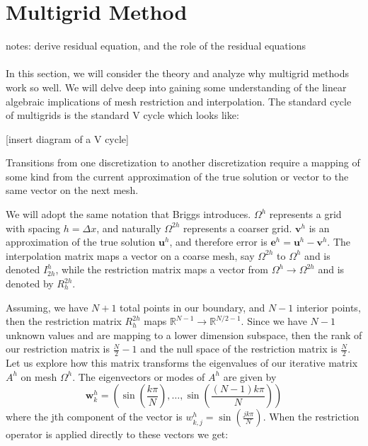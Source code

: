 \documentclass[pdftex,12pt,a4paper]{article}
\begin{document}
\section{Multigrid Method}

notes: 
derive residual equation, and the role of the residual equations



\paragraph{} In this section, we will consider the theory and analyze why multigrid methods work so well.  We will delve deep into gaining some understanding of the linear algebraic implications of mesh restriction and interpolation.  The standard cycle of multigrids is the standard V cycle which looks like: 

[insert diagram of a V cycle]

Transitions from one discretization to another discretization require a mapping of some kind from the current approximation of the true solution or vector to the same vector on the next mesh.  

We will adopt the same notation that Briggs introduces. $\Omega^{h}$ represents a grid with spacing $h = \Delta x $, and naturally $\Omega^{2h}$ represents a coarser grid.   $\mathbf{v}^h$ is an approximation of the true solution $\mathbf{u}^h$, and therefore error is $\mathbf{e}^h = \mathbf{u}^h - \mathbf{v}^h$.  The interpolation matrix maps a vector on a coarse mesh, say $\Omega^{2h}$ to $\Omega^{h}$ and is denoted $I_{2h}^h$, while the restriction matrix maps a vector from $\Omega^{h} \rightarrow \Omega^{2h}$ and is denoted by $R_h^{2h}$.  

Assuming, we have $N+1$ total points in our boundary, and $N-1$ interior points, then the restriction matrix $R_h^{2h}$ maps $\mathbb{R}^{N-1} \rightarrow \mathbb{R}^{N/2 -1}$.  Since we have $N-1$ unknown values and are mapping to a lower dimension subspace, then the rank of our restriction matrix is $\frac{N}{2} -1 $ and the null space of the restriction matrix is $\frac{N}{2}$.  Let us explore how this matrix transforms the eigenvalues of our iterative matrix $A^h$ on mesh $\Omega^h$.  The eigenvectors or modes of $A^h$ are given by 
$$\mathbf{w}_{k}^h = \left( \sin\left( \frac{k \pi}{N}\right), \dots, \sin\left( \frac{(N-1)k \pi}{N}\right) \right)$$ where the jth component of the vector is $w_{k,j}^h = \sin\left( \frac{jk \pi}{N}\right)$.  When the restriction operator is applied directly to these vectors we get: 
\end{document}
